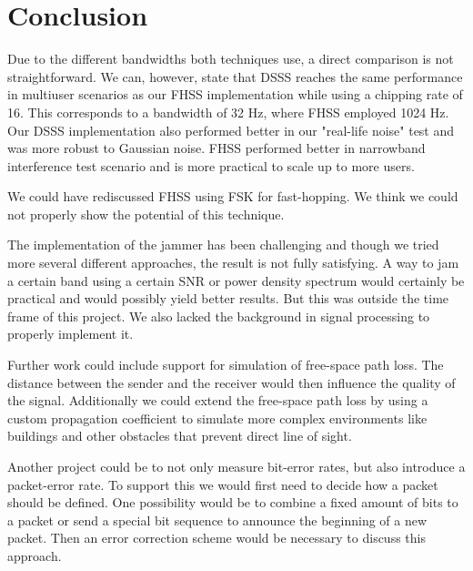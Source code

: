 \section{Conclusion}
	Due to the different bandwidths both techniques use, a direct comparison is not straightforward.
    We can, however, state that DSSS reaches the same performance in multiuser scenarios as our FHSS implementation while using a chipping rate of 16. This corresponds to a bandwidth of 32 Hz, where FHSS employed 1024 Hz.
    Our DSSS implementation also performed better in our "real-life noise" test and was more robust to Gaussian noise. %
    FHSS performed better in narrowband interference test scenario and is more practical to scale up to more users.
    
    We could have rediscussed FHSS using FSK for fast-hopping. We think we could not properly show the potential of this technique.
    
    The implementation of the jammer has been challenging and though we tried more several different approaches, the result is not fully satisfying.
    A way to jam a certain band using a certain SNR or power density spectrum would certainly be practical and would possibly yield better results.
    But this was outside the time frame of this project.
    We also lacked the background in signal processing to properly implement it.
    
    Further work could include support for simulation of free-space path loss.
    The distance between the sender and the receiver would then influence the quality of the signal.
    Additionally we could extend the free-space path loss by using a custom propagation coefficient to simulate more complex environments like buildings and other obstacles that prevent direct line of sight.
    
    Another project could be to not only measure bit-error rates, but also introduce a packet-error rate.
    To support this we would first need to decide how a packet should be defined.
    One possibility would be to combine a fixed amount of bits to a packet or send a special bit sequence to announce the beginning of a new packet.
    Then an error correction scheme would be necessary to discuss this approach.
